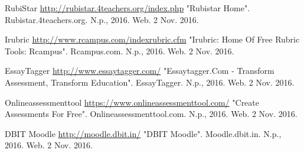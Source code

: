\begin{thebibliography}{99}
 RubiStar \url{http://rubistar.4teachers.org/index.php}
"Rubistar Home". Rubistar.4teachers.org. N.p., 2016. Web. 2 Nov. 2016.


 Irubric
\url{http://www.rcampus.com/indexrubric.cfm}
"Irubric: Home Of Free Rubric Tools: Rcampus". Rcampus.com. N.p., 2016. Web. 2 Nov. 2016.

 EssayTagger
\url{http://www.essaytagger.com/}
"Essaytagger.Com - Transform Assessment, Transform Education". EssayTagger. N.p., 2016. Web. 2 Nov. 2016.


 Onlineassessmenttool
\url{https://www.onlineassessmenttool.com/}
"Create Assessments For Free". Onlineassessmenttool.com. N.p., 2016. Web. 2 Nov. 2016.


 DBIT Moodle 
\url{http://moodle.dbit.in/}
"DBIT Moodle". Moodle.dbit.in. N.p., 2016. Web. 2 Nov. 2016.

\end{thebibliography}